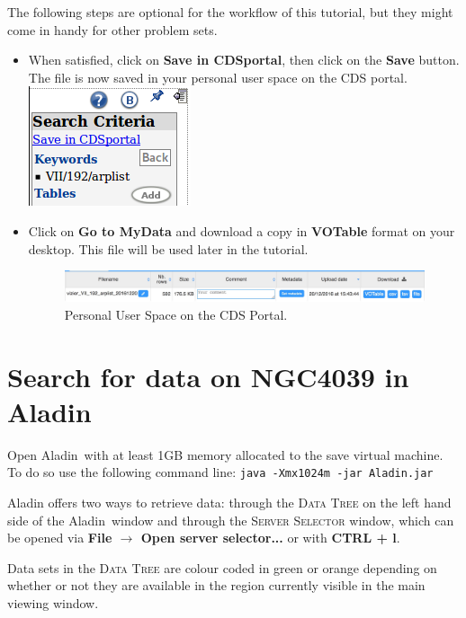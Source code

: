 \documentclass [a4paper, 12pt]{article}
\newcommand{\aladin}{{\textsc{A}{ladin}}}
\begin{document}
The following steps are optional for the workflow of this tutorial, but they 
might come in handy for other problem sets. 
\begin{itemize}
\item When satisfied, click on \textbf{Save in CDSportal}, then click 
on the \textbf{Save} button. The file is now saved in your personal 
user space on the CDS portal.\includegraphics[width=0.1  
\textwidth]{../images/vizier_saveto_CDSportal.png}
\item Click on \textbf{Go to MyData} and download a copy in 
\textbf{VOTable} format on your desktop. This file will be used later 
in the tutorial.
\begin{figure}[H]
\center
\includegraphics[width=1  \textwidth]{../images/cdsportal_mydata.jpg}
\caption{Personal User Space on the CDS Portal.}
\label{fig:download}
\end{figure}
\end{itemize}



\section{Search for data on NGC4039 in \aladin}

Open \aladin\ with at least 1GB memory allocated to the save virtual 
machine. To do so use the following command line: \texttt{java -Xmx1024m -jar 
Aladin.jar}

Aladin offers two ways to retrieve data: through the \textsc{Data Tree} on the 
left hand side of the \aladin\ window and through the 
\textsc{Server Selector} window, which can be opened via \textbf{File 
$\rightarrow$ Open server selector...} or with \textbf{CTRL + l}. 

Data sets in the \textsc{Data Tree} are colour coded in green or orange 
depending on whether or not they are available in the region currently visible 
in the main viewing window. 
\end{document}
